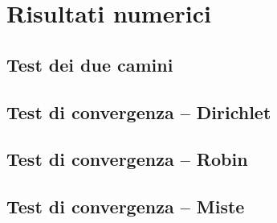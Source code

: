 \section{Risultati numerici}
\subsection{Test dei due camini}
\subsection{Test di convergenza -- Dirichlet}
\subsection{Test di convergenza -- Robin}
\subsection{Test di convergenza -- Miste}